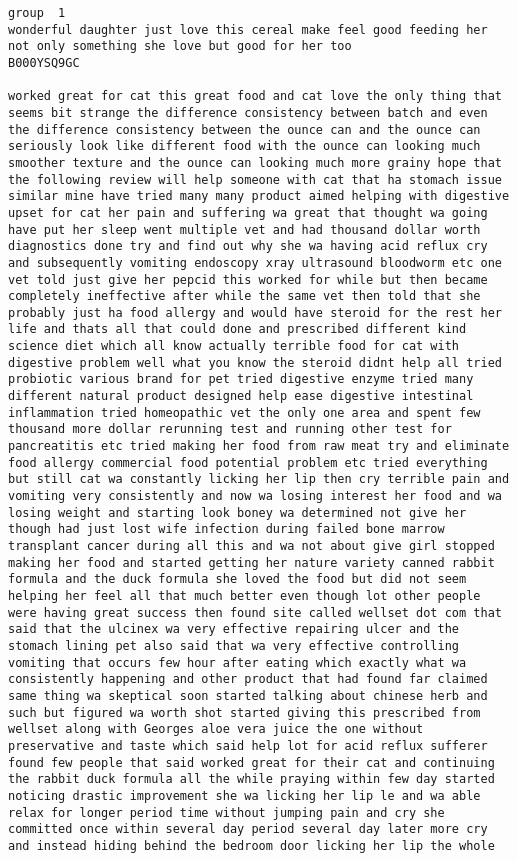 \documentclass[11pt]{article}
\begin{document}
\begin{Verbatim}[commandchars=\\\{\}]
group  1
wonderful daughter just love this cereal make feel good feeding her not only something she love but good for her too
B000YSQ9GC

worked great for cat this great food and cat love the only thing that seems bit strange the difference consistency between batch and even the difference consistency between the ounce can and the ounce can seriously look like different food with the ounce can looking much smoother texture and the ounce can looking much more grainy hope that the following review will help someone with cat that ha stomach issue similar mine have tried many many product aimed helping with digestive upset for cat her pain and suffering wa great that thought wa going have put her sleep went multiple vet and had thousand dollar worth diagnostics done try and find out why she wa having acid reflux cry and subsequently vomiting endoscopy xray ultrasound bloodworm etc one vet told just give her pepcid this worked for while but then became completely ineffective after while the same vet then told that she probably just ha food allergy and would have steroid for the rest her life and thats all that could done and prescribed different kind science diet which all know actually terrible food for cat with digestive problem well what you know the steroid didnt help all tried probiotic various brand for pet tried digestive enzyme tried many different natural product designed help ease digestive intestinal inflammation tried homeopathic vet the only one area and spent few thousand more dollar rerunning test and running other test for pancreatitis etc tried making her food from raw meat try and eliminate food allergy commercial food potential problem etc tried everything but still cat wa constantly licking her lip then cry terrible pain and vomiting very consistently and now wa losing interest her food and wa losing weight and starting look boney wa determined not give her though had just lost wife infection during failed bone marrow transplant cancer during all this and wa not about give girl stopped making her food and started getting her nature variety canned rabbit formula and the duck formula she loved the food but did not seem helping her feel all that much better even though lot other people were having great success then found site called wellset dot com that said that the ulcinex wa very effective repairing ulcer and the stomach lining pet also said that wa very effective controlling vomiting that occurs few hour after eating which exactly what wa consistently happening and other product that had found far claimed same thing wa skeptical soon started talking about chinese herb and such but figured wa worth shot started giving this prescribed from wellset along with Georges aloe vera juice the one without preservative and taste which said help lot for acid reflux sufferer found few people that said worked great for their cat and continuing the rabbit duck formula all the while praying within few day started noticing drastic improvement she wa licking her lip le and wa able relax for longer period time without jumping pain and cry she committed once within several day period several day later more cry and instead hiding behind the bedroom door licking her lip the whole 
\end{Verbatim}
\end{document}
